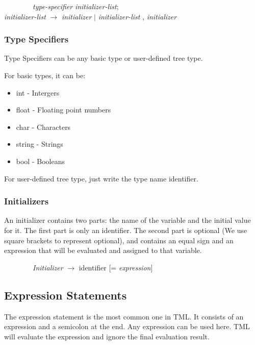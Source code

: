 \documentclass[12pt,psfig,a4]{article}
\begin{document}
\begin{code}
\begin{tabbing}
~~~~~~~~\= \textsl{type-specifier} \textsl{initializer-list}; \\
\> \textsl{initializer-list}  $\rightarrow$ \textsl{initializer} $\mid$ \textsl{initializer-list} , \textsl{initializer}
\end{tabbing}
\end{code}

\subsubsection{Type Specifiers} \label{typeSpec}
\label{ts}
Type Specifiers can be any basic type or user-defined tree type.

For basic types, it can be:
\begin{itemize}
\setlength{\itemsep}{0pt}
\setlength{\parskip}{0pt}
\item int - Intergers
\item float - Floating point numbers
\item char - Characters
\item string - Strings
\item bool - Booleans
\end{itemize}

For user-defined tree type, just write the type name identifier.

\subsubsection{Initializers}
An initializer contains two parts: the name of the variable and the initial value for it. The first part is only an identifier. The second part is optional (We use square brackets to represent optional), and contains an equal sign and an expression that will be evaluated and assigned to that variable.

\begin{code}
\begin{tabbing}
~~~~~~~~\textsl{Initializer} $\rightarrow$ identifier [= \textsl{expression}]
\end{tabbing}
\end{code}

\subsection{Expression Statements}
The expression statement is the most common one in TML. It consists of an expression and a semicolon at the end. Any expression can be used here. TML will evaluate the expression and ignore the final evaluation result.
\end{document}
